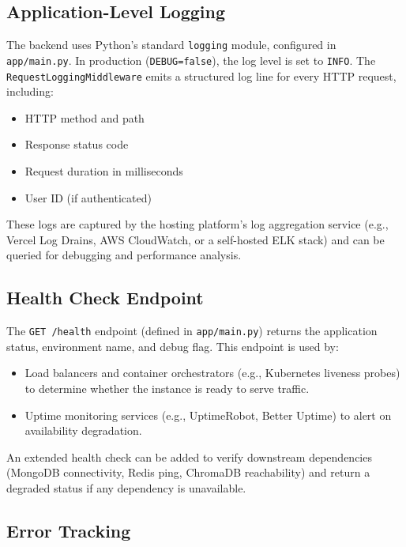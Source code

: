 \subsection{Application-Level Logging}

The backend uses Python's standard \texttt{logging} module, configured in \texttt{app/main.py}. In production (\texttt{DEBUG=false}), the log level is set to \texttt{INFO}. The \texttt{RequestLoggingMiddleware} emits a structured log line for every HTTP request, including:

\begin{itemize}
    \item HTTP method and path
    \item Response status code
    \item Request duration in milliseconds
    \item User ID (if authenticated)
\end{itemize}

These logs are captured by the hosting platform's log aggregation service (e.g., Vercel Log Drains, AWS CloudWatch, or a self-hosted ELK stack) and can be queried for debugging and performance analysis.

\subsection{Health Check Endpoint}

The \texttt{GET /health} endpoint (defined in \texttt{app/main.py}) returns the application status, environment name, and debug flag. This endpoint is used by:

\begin{itemize}
    \item Load balancers and container orchestrators (e.g., Kubernetes liveness probes) to determine whether the instance is ready to serve traffic.
    \item Uptime monitoring services (e.g., UptimeRobot, Better Uptime) to alert on availability degradation.
\end{itemize}

An extended health check can be added to verify downstream dependencies (MongoDB connectivity, Redis ping, ChromaDB reachability) and return a degraded status if any dependency is unavailable.

\subsection{Error Tracking}

